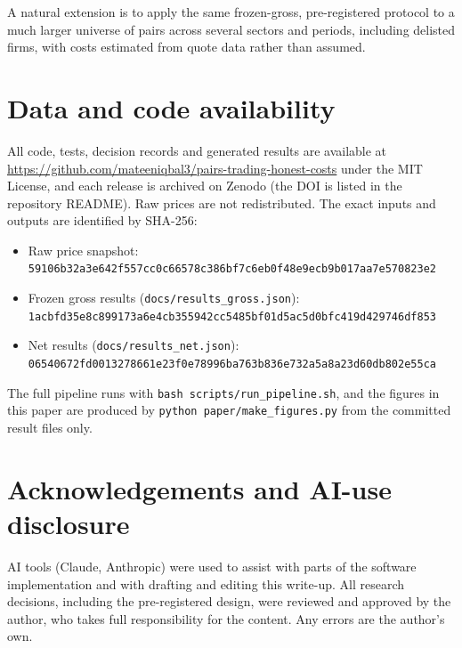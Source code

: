 \documentclass[11pt]{article}
\providecommand{\tightlist}{\setlength{\itemsep}{0pt}\setlength{\parskip}{0pt}}
\begin{document}
A natural extension is to apply the same frozen-gross, pre-registered
protocol to a much larger universe of pairs across several sectors and
periods, including delisted firms, with costs estimated from quote data
rather than assumed.

\hypertarget{data-and-code-availability}{%
\section*{Data and code availability}\label{data-and-code-availability}}

All code, tests, decision records and generated results are available at
\url{https://github.com/mateeniqbal3/pairs-trading-honest-costs} under the MIT
License, and each release is archived on Zenodo (the DOI is listed in
the repository README). Raw prices are not
redistributed. The exact inputs and outputs are identified by SHA-256:

\begin{itemize}
\tightlist
\item
  Raw price snapshot:\\
  \texttt{59106b32a3e642f557cc0c66578c386bf7c6eb0f48e9ecb9b017aa7e570823e2}
\item
  Frozen gross results (\texttt{docs/results\_gross.json}):\\
  \texttt{1acbfd35e8c899173a6e4cb355942cc5485bf01d5ac5d0bfc419d429746df853}
\item
  Net results (\texttt{docs/results\_net.json}):\\
  \texttt{06540672fd0013278661e23f0e78996ba763b836e732a5a8a23d60db802e55ca}
\end{itemize}

The
full pipeline runs with \texttt{bash\ scripts/run\_pipeline.sh}, and the figures in
this paper are produced by \texttt{python\ paper/make\_figures.py} from the
committed result files only.

\hypertarget{acknowledgements-and-ai-use-disclosure}{%
\section*{Acknowledgements and AI-use disclosure}\label{acknowledgements-and-ai-use-disclosure}}

AI tools (Claude, Anthropic) were used to assist with parts of the
software implementation and with drafting and editing this write-up. All
research decisions, including the pre-registered design, were reviewed
and approved by the author, who takes full responsibility for the
content. Any errors are the author's own.
\end{document}
